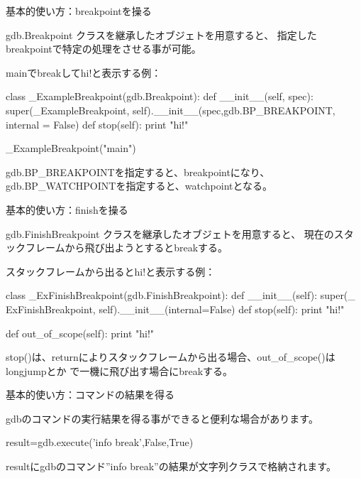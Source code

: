 \begin{frame}[containsverbatim]{基本的使い方：breakpointを操る}

gdb.Breakpoint クラスを継承したオブジェトを用意すると、
指定したbreakpointで特定の処理をさせる事が可能。

mainでbreakしてhi!と表示する例：
\begin{commandline}
class _ExampleBreakpoint(gdb.Breakpoint):
   def __init__(self, spec):
       super(_ExampleBreakpoint, 
            self).__init__(spec,gdb.BP_BREAKPOINT,
                          internal = False)
   def stop(self):
        print "hi!"

_ExampleBreakpoint("main")
\end{commandline}

gdb.BP\_BREAKPOINTを指定すると、breakpointになり、
gdb.BP\_WATCHPOINTを指定すると、watchpointとなる。
\end{frame}

\begin{frame}[containsverbatim]{基本的使い方：finishを操る}

gdb.FinishBreakpoint クラスを継承したオブジェトを用意すると、
現在のスタックフレームから飛び出ようとするとbreakする。

スタックフレームから出るとhi!と表示する例：
\begin{commandline}
class _ExFinishBreakpoint(gdb.FinishBreakpoint):
   def __init__(self):
        super(_ ExFinishBreakpoint, 
              self).__init__(internal=False)
   def stop(self):
        print "hi!"

   def out_of_scope(self):
        print "hi!"
\end{commandline}

stop()は、returnによりスタックフレームから出る場合、out\_of\_scope()はlongjumpとか
で一機に飛び出す場合にbreakする。

\end{frame}

\begin{frame}[containsverbatim]{基本的使い方：コマンドの結果を得る}

gdbのコマンドの実行結果を得る事ができると便利な場合があります。

\begin{commandline}
result=gdb.execute('info break',False,True)
\end{commandline}

resultにgdbのコマンド''info break''の結果が文字列クラスで格納されます。

\end{frame}

